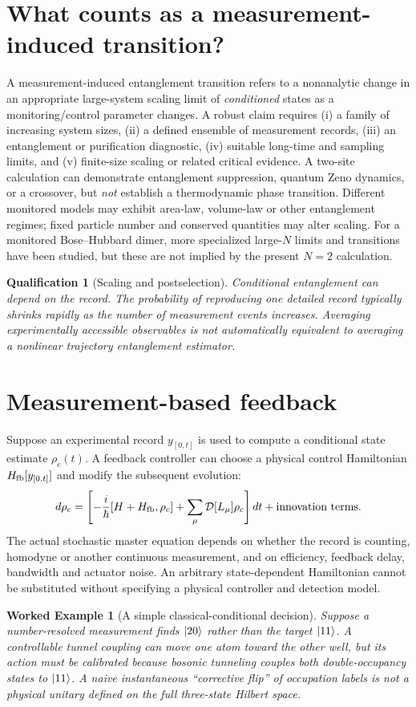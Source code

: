 \documentclass[11pt,a4paper]{article}
\newtheorem{example}{Worked Example}\newtheorem{remark}{Qualification}\newtheorem{proposition}{Proposition}
\begin{document}
\section{What counts as a measurement-induced transition?}
A measurement-induced entanglement transition refers to a nonanalytic change in an appropriate large-system scaling limit of \emph{conditioned} states as a monitoring/control parameter changes. A robust claim requires (i) a family of increasing system sizes, (ii) a defined ensemble of measurement records, (iii) an entanglement or purification diagnostic, (iv) suitable long-time and sampling limits, and (v) finite-size scaling or related critical evidence.
A two-site calculation can demonstrate entanglement suppression, quantum Zeno dynamics, or a crossover, but \emph{not} establish a thermodynamic phase transition. Different monitored models may exhibit area-law, volume-law or other entanglement regimes; fixed particle number and conserved quantities may alter scaling. For a monitored Bose--Hubbard dimer, more specialized large-$N$ limits and transitions have been studied, but these are not implied by the present $N=2$ calculation.
\begin{remark}[Scaling and postselection]
Conditional entanglement can depend on the record. The probability of reproducing one detailed record typically shrinks rapidly as the number of measurement events increases. Averaging experimentally accessible observables is not automatically equivalent to averaging a nonlinear trajectory entanglement estimator.
\end{remark}
\section{Measurement-based feedback}
Suppose an experimental record $y_{[0,t]}$ is used to compute a conditional state estimate $\rho_c(t)$. A feedback controller can choose a physical control Hamiltonian $H_{\rm fb}[y_{[0,t]}]$ and modify the subsequent evolution:
\begin{equation}d\rho_c=\left[-\frac{i}{\hbar}[H+H_{\rm fb},\rho_c]+\sum_\mu\mathcal D[L_\mu]\rho_c\right]dt+\text{innovation terms}.\end{equation}
The actual stochastic master equation depends on whether the record is counting, homodyne or another continuous measurement, and on efficiency, feedback delay, bandwidth and actuator noise. An arbitrary state-dependent Hamiltonian cannot be substituted without specifying a physical controller and detection model.
\begin{example}[A simple classical-conditional decision]
Suppose a number-resolved measurement finds $|20\rangle$ rather than the target $|11\rangle$. A controllable tunnel coupling can move one atom toward the other well, but its action must be calibrated because bosonic tunneling couples both double-occupancy states to $|11\rangle$. A naive instantaneous ``corrective flip'' of occupation labels is not a physical unitary defined on the full three-state Hilbert space.
\end{example}
\end{document}
